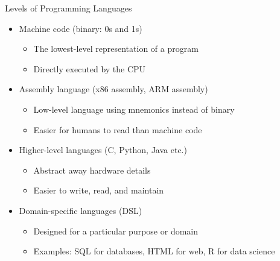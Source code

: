 \documentclass[12pt, aspectratio=169]{beamer}
\begin{document}
    \begin{frame}{Levels of Programming Languages}
        \begin{itemize}
            \item Machine code (binary: 0s and 1s)
            \begin{itemize}
                \item The lowest-level representation of a program
                \item Directly executed by the CPU
            \end{itemize}
            
            \item Assembly language (x86 assembly, ARM assembly)
            \begin{itemize}
                \item Low-level language using mnemonics instead of binary
                \item Easier for humans to read than machine code
            \end{itemize}

            \item Higher-level languages (C, Python, Java etc.)
            \begin{itemize} 
                \item Abstract away hardware details
                \item Easier to write, read, and maintain
            \end{itemize}

            \item Domain-specific languages (DSL)
            \begin{itemize}
                \item Designed for a particular purpose or domain
                \item Examples: SQL for databases, HTML for web, R for data science
            \end{itemize}
        \end{itemize}
    \end{frame}
\end{document}

